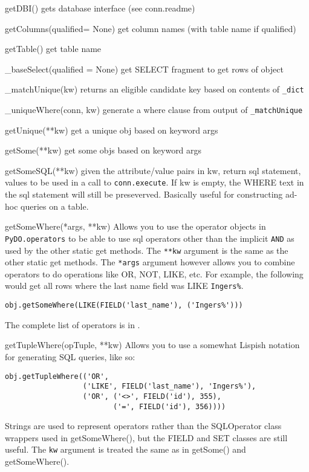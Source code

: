 \documentclass[titlepage]{manual}
\begin{document}
\begin{argdesc}
\item[getDBI()] gets database interface (see conn.readme)
\item[getColumns(qualified= None)] get column names (with table name
if qualified)
\item[getTable()] get table name
\item[_baseSelect(qualified = None)] get SELECT fragment to get rows
of object
\item[_matchUnique(kw)] returns an eligible candidate key based on
contents of \texttt{\_dict}
\item[_uniqueWhere(conn, kw)] generate a where clause from output of
\texttt{\_matchUnique}
\item[getUnique(**kw)] get a unique obj based on keyword args
\item[getSome(**kw)] get some objs based on keyword args
\item[getSomeSQL(**kw)] given the attribute/value pairs in kw, return
sql statement, values to be used in a call to \texttt{conn.execute}.
If kw is empty, the WHERE text in the sql statement will still be
preseverved.  Basically useful for constructing ad-hoc queries on a
table.
\item[getSomeWhere(*args, **kw)] Allows you to use the operator
objects in \texttt{PyDO.operators} to be able to use sql operators
other than the implicit \texttt{AND} as used by the other static get
methods.  The \texttt{**kw} argument is the same as the other static
get methods.  The \texttt{*args} argument however allows you to
combine operators to do operations like OR, NOT, LIKE, etc.  For
example, the following would get all rows where the last name field
was LIKE \texttt{Ingers\%}.
\begin{verbatim}
obj.getSomeWhere(LIKE(FIELD('last_name'), ('Ingers%')))
\end{verbatim}

The complete list of operators is in .
\item[getTupleWhere(opTuple, **kw)] Allows you to use a somewhat
Lispish notation for generating SQL queries, like so:
\begin{verbatim}
obj.getTupleWhere(('OR', 
                  ('LIKE', FIELD('last_name'), 'Ingers%'), 
                  ('OR', ('<>', FIELD('id'), 355),
                         ('=', FIELD('id'), 356))))
\end{verbatim}

Strings are used to represent operators rather than the SQLOperator class wrappers 
used in getSomeWhere(), but the FIELD and SET classes are still useful.
The \texttt{kw} argument is treated the same as in getSome() and 
getSomeWhere().


\end{argdesc}
\end{document}
